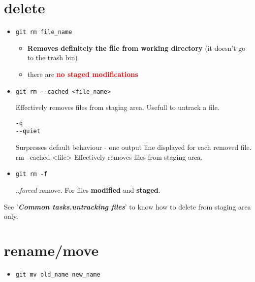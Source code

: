 \documentclass{report}
\begin{document}
\section{delete}
\begin{itemize}
	\item \begin{verbatim}
git rm file_name
	\end{verbatim}
	\begin{itemize}
		\item \textbf{Removes definitely the file from working directory} (it doesn't go to the trash bin)
		\item there are \textbf{\textcolor{red}{no staged modifications}}
	\end{itemize}
	
	\item \begin{verbatim}
git rm --cached <file_name>
	\end{verbatim}
	Effectively removes files from staging area. Usefull to untrack a file.
	\begin{verbatim}
-q
--quiet
	\end{verbatim}
	Surpresses default behaviour - one output line displayed for each removed file. rm  --cached \textless file\textgreater
	Effectively removes files from staging area.
	
	\item \begin{verbatim}
git rm -f
	\end{verbatim}
	..\textit{forced} remove. For files \textbf{modified} and \textbf{staged}.

\end{itemize}
See '\textbf{\textit{Common tasks.untracking files}}' to know how to delete from staging area only.

\section{rename/move}
\begin{itemize}
\item \begin{verbatim}
git mv old_name new_name
\end{verbatim} 
\end{itemize}
\end{document}
